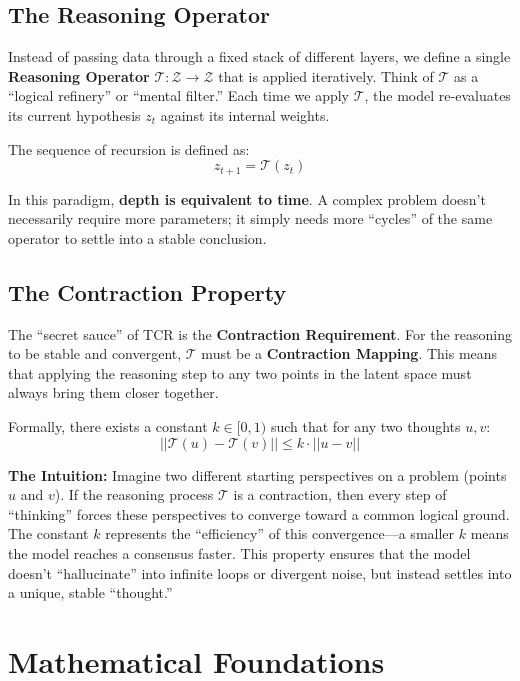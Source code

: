 \documentclass[11pt, a4paper]{article}
\begin{document}
\subsection{The Reasoning Operator}
Instead of passing data through a fixed stack of different layers, we define a single \textbf{Reasoning Operator} $\mathcal{T}: \mathcal{Z} \to \mathcal{Z}$ that is applied iteratively. Think of $\mathcal{T}$ as a ``logical refinery'' or ``mental filter.'' Each time we apply $\mathcal{T}$, the model re-evaluates its current hypothesis $z_t$ against its internal weights.

The sequence of recursion is defined as:
\begin{equation}
 z_{t+1} = \mathcal{T}(z_t) 
\end{equation}

In this paradigm, \textbf{depth is equivalent to time}. A complex problem doesn't necessarily require more parameters; it simply needs more ``cycles'' of the same operator to settle into a stable conclusion.

\subsection{The Contraction Property}
The ``secret sauce'' of TCR is the \textbf{Contraction Requirement}. For the reasoning to be stable and convergent, $\mathcal{T}$ must be a \textbf{Contraction Mapping}. This means that applying the reasoning step to any two points in the latent space must always bring them closer together. 

Formally, there exists a constant $k \in [0, 1)$ such that for any two thoughts $u, v$:
\begin{equation}
 ||\mathcal{T}(u) - \mathcal{T}(v)|| \le k \cdot ||u - v|| 
\end{equation}

\textbf{The Intuition:} Imagine two different starting perspectives on a problem (points $u$ and $v$). If the reasoning process $\mathcal{T}$ is a contraction, then every step of ``thinking'' forces these perspectives to converge toward a common logical ground. The constant $k$ represents the ``efficiency'' of this convergence---a smaller $k$ means the model reaches a consensus faster. This property ensures that the model doesn't ``hallucinate'' into infinite loops or divergent noise, but instead settles into a unique, stable ``thought.''

\section{Mathematical Foundations}
\end{document}
